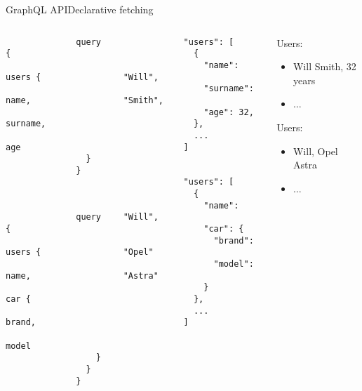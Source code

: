 \documentclass{beamer}
\begin{document}
  \begin{frame}[fragile]{GraphQL API}{Declarative fetching}
    \begin{columns}
        \begin{column}{0.2\textwidth}
          \scriptsize
          \begin{verbatim}
              query {
                users {
                  name,
                  surname,
                  age
                }
              }



              query {
                users {
                  name,
                  car {
                    brand,
                    model
                  }
                }
              }

          \end{verbatim}
        \end{column}
        \begin{column}{0.35\textwidth}
          \scriptsize
          \begin{verbatim}
            "users": [
              {
                "name": "Will",
                "surname": "Smith",
                "age": 32,
              },
              ...
            ]


            "users": [
              {
                "name": "Will",
                "car": {
                  "brand": "Opel"
                  "model": "Astra"
                }
              },
              ...
            ]
          \end{verbatim}
        \end{column}
        \begin{column}{0.44\textwidth}
          \footnotesize
          Users:
          \begin{itemize}
            \item Will Smith, 32 years
            \item ...
          \end{itemize}
          \vspace{5.5em}
          Users:
          \begin{itemize}
            \item Will, Opel Astra
            \item ...
          \end{itemize}
          \vspace{5em}
        \end{column}
    \end{columns}
  \end{frame}
\end{document}
